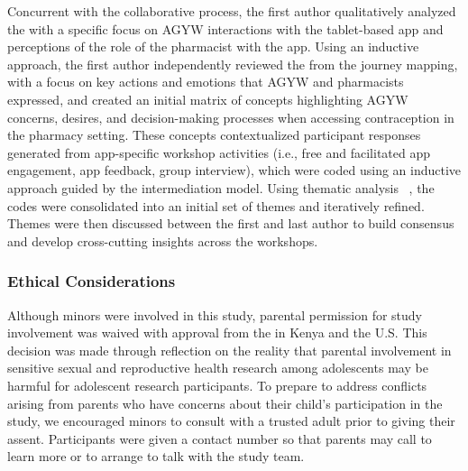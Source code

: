 Concurrent with the collaborative process, the first author qualitatively analyzed the  with a specific focus on AGYW interactions with the tablet-based app and perceptions of the role of the pharmacist with the app. Using an inductive approach, the first author independently reviewed the  from the journey mapping, with a focus on key actions and emotions that AGYW and pharmacists expressed, and created an initial matrix of concepts highlighting AGYW concerns, desires, and decision-making processes when accessing contraception in the pharmacy setting. These concepts contextualized participant responses generated from app-specific workshop activities (i.e., free and facilitated app engagement, app feedback, group interview), which were coded using an inductive approach guided by the intermediation model. Using thematic analysis ~\cite{Braun_Clarke_2022}, the codes were consolidated into an initial set of themes and iteratively refined. Themes were then discussed between the first and last author to build consensus and develop cross-cutting insights across the workshops.  




\subsubsection{Ethical Considerations}
Although minors were involved in this study, parental permission for study involvement was waived with approval from the  in Kenya and the U.S. This decision was made through reflection on the reality that parental involvement in sensitive sexual and reproductive health research among adolescents may be harmful for adolescent research participants. To prepare to address conflicts arising from parents who have concerns about their child’s participation in the study, we encouraged minors to consult with a trusted adult prior to giving their assent. Participants were given a contact number so that parents may call to learn more or to arrange to talk with the study team. 
